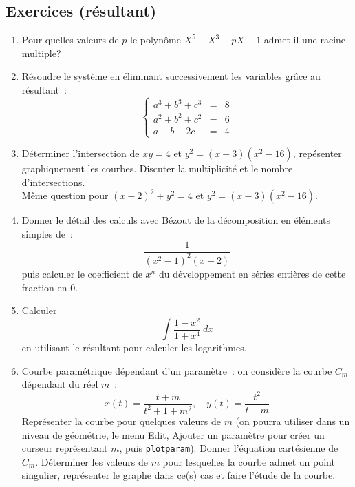 \documentclass[a4paper,11pt]{article}
\begin{document}
\subsection{Exercices (r\'esultant)}

\begin{enumerate}
\item Pour quelles valeurs de $p$ le polyn\^ome $X^5+X^3-pX+1$ admet-il
une racine multiple?
\item R\'esoudre le syst\`eme en \'eliminant successivement les
variables gr\^ace au r\'esultant~:
\[
\left\{\begin{array}{rcl}
a^{3}+b^{3}+c^{3} & = & 8 \\
a^{2}+b^{2}+c^{2} & = & 6 \\
a+b+2c & = & 4
\end{array}\right.
\]
\item D\'eterminer l'intersection de $xy=4$ et $ y^2=(x-3)(x^2-16)$,
rep\'esenter graphiquement les courbes. Discuter la multiplicit\'e
et le nombre d'intersections.\\
M\^eme question pour $(x-2)^2+y^2=4$ et $y^2=(x-3)(x^2-16)$.
\item Donner le d\'etail des calculs avec B\'ezout de la d\'ecomposition
en \'el\'ements simples de~:
\[ \frac{1}{(x^2-1)^2(x+2)}\]
puis calculer le coefficient de $x^n$ du d\'eveloppement en s\'eries
enti\`eres de cette fraction en 0.
\item Calculer 
\[ \int \frac{1-x^2}{1+x^4} \ dx \]
en utilisant le r\'esultant pour calculer les logarithmes.
\item Courbe param\'etrique d\'ependant d'un param\`etre~:
on consid\`ere la courbe $C_m$ d\'ependant du r\'eel $m$~:
$$ x(t)=\frac{t+m}{t^2+1+m^2}, \quad y(t)=\frac{t^2}{t-m}$$
Repr\'esenter la courbe pour quelques valeurs de $m$ (on pourra
utiliser dans un niveau de g\'eom\'etrie, le menu Edit, Ajouter un
param\`etre pour cr\'eer un curseur repr\'esentant $m$, puis 
\verb|plotparam|). Donner l'\'equation cart\'esienne de $C_m$.
D\'eterminer les valeurs de $m$ pour lesquelles
la courbe admet un point singulier, repr\'esenter le graphe dans ce(s)
cas et faire l'\'etude de la courbe.
\end{enumerate}
\end{document}
